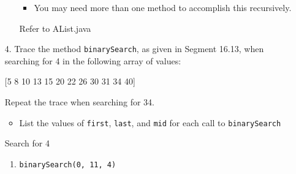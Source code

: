 \documentclass[10pt]{article}
\begin{document}
\begin{enumerate}
\begin{enumerate}
					\begin{itemize}
						\item You may need more than one method to accomplish this recursively.
					\end{itemize}
					
					\vspace{0.5cm}
					Refer to AList.java
					\vspace{0.5cm}
			\end{enumerate}
		
		\item[4.] Trace the method \texttt{binarySearch}, as given in Segment 16.13, when searching for 4 in the following array of values:
		
			\vspace{0.5cm}
			[5 8 10 13 15 20 22 26 30 31 34 40]
			
			\vspace{0.5cm}
			Repeat the trace when searching for 34.
				
				\begin{itemize}
					\item List the values of \texttt{first}, \texttt{last}, and \texttt{mid} for each call to \texttt{binarySearch}
				\end{itemize}
				
			\vspace{0.5cm}
           		
           		\vspace{0.5cm}
           		Search for 4
           		
           		\begin{enumerate}
           			\item \texttt{binarySearch(0, 11, 4)}
           			
\end{enumerate}
\end{enumerate}
\end{document}
